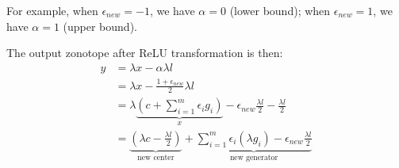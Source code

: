 \documentclass[oneside,11pt,dvipsnames]{book}
\numberwithin{equation}{section}
\theoremstyle{definition}
\theoremstyle{remark}
\begin{document}
For example, when \(\epsilon_{new} = -1\), we have \(\alpha = 0\) (lower bound); when \(\epsilon_{new} = 1\), we have \(\alpha = 1\) (upper bound).

The output zonotope after ReLU transformation is then:
\begin{align*}
    y  & = \lambda x - \alpha \lambda l \\
    &= \lambda x - \frac{1 + \epsilon_{new}}{2} \lambda l\\
      &= \lambda \underbrace{\left(c + \sum_{i=1}^m \epsilon_i g_i\right)}_{x} - \epsilon_{new} \frac{\lambda l }{2} - \frac{\lambda l }{2}  \\
      &= \underbrace{\left(\lambda c -  \frac{\lambda l }{2}\right)}_{\text{new center}} +  \underbrace{\sum_{i=1}^m \epsilon_i (\lambda g_i) - \epsilon_{new} \frac{\lambda l }{2}}_{\text{new generator}}
\end{align*}
\end{document}
